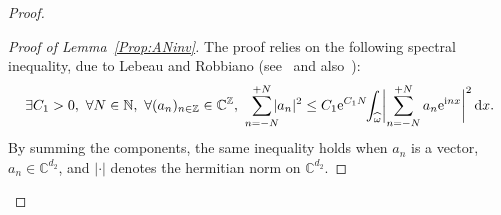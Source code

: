 \documentclass[JEP,XML,SOM,Unicode,NoEqCountersInSection]{cedram}
\theoremstyle{plain}
\theoremstyle{definition}
\theoremstyle{remark}
\newcommand{\diff}[1][-3]{\ensuremath{\mathop{}\mkern#1mu\mathrm{d}}}
\newcommand{\set}{\mathbb}
\newcommand{\N}{\set{N}}
\newcommand{\Z}{\set{Z}}
\renewcommand{\C}{\set{C}}
\newcommand{\eu}{\mathrm e}
\newcommand{\iu}{\mathrm i}
\begin{document}
\begin{proof}
\begin{proof}[Proof of Lemma~\ref{Prop:ANinv}]
The proof relies on the following spectral inequality, due to Lebeau and Robbiano (see~\cite{lebeau_1995} and also~\cite[Th.\,5.4]{lerousseau_2012}):
\begin{equation}\label{eq:spectral}
\exists C_1>0,\ \forall N \in \N,\ \forall (a_n)_{n\in\Z} \in \C^\Z, \
\sum_{n=-N}^{+N}\hspace*{-2mm} |a_n|^2 \leq C_1 \eu^{C_1 N} \hspace*{-1mm}\int_{\widehat{\omega}} \biggl|\sum_{n=-N}^{+N} a_n \eu^{\iu nx}\biggr|^2 \diff x.
\end{equation}
By summing the components, the same inequality holds when $a_n$ is a vector, $a_n \in \C^{d_2}$, and $|\cdot|$ denotes the hermitian norm on $\C^{d_2}$.


\end{proof}
\end{proof}
\end{document}
